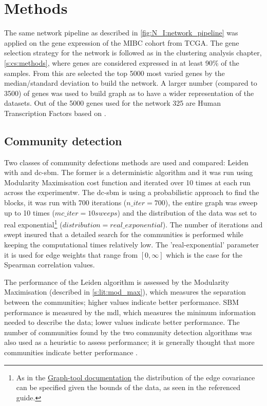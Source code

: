 \section{Methods}


The same network pipeline as described in \cref{fig:N_I:network_pipeline} was applied on the gene expression of the MIBC cohort from TCGA. The gene selection strategy for the network is followed as in the clustering analysis chapter, \cref{s:cs:methods}, where genes are considered expressed in at least 90\% of the samples. From this are selected the top 5000 most varied genes by the median/standard deviation to build the network. A larger number (compared to 3500) of genes was used to build graph as to have a wider representation of the datasets. Out of the 5000 genes used for the network 325 are Human Transcription Factors based on \citet{Lambert2018-el}.
 
\subsection*{Community detection} \label{s:N_I:sel_tfs_methods_comm_detection}

 Two classes of community defections methods are used and compared: Leiden with  and \acrfull{dc-sbm}. The former is a deterministic algorithm and it was run using Modularity Maximisation cost function and iterated over 10 times at each run across the experimentw. The \acrshort{dc-sbm} is using a probabilistic approach to find the blocks, it was run with 700 iterations ($n\_iter=700$), the entire graph was sweep up to 10 times ($mc\_iter = 10 sweeps$) and the distribution of the data was set to real exponential\footnote{As in the \href{https://graph-tool.skewed.de/static/doc/demos/inference/inference.html}{Graph-tool documentation} the distribution of the edge covariance can be specified given the bounds of the data, as seen in the referenced guide.} ($distribution = real\_exponential$). The number of iterations and swept insured that a detailed search for the communities is performed while keeping the computational times relatively low. The 'real-exponential' parameter it is used for edge weights that range from $[0, \infty]$ which is the case for the Spearman correlation values.


The performance of the Leiden algorithm is assessed by the Modularity Maximisation (described in \cref{s:lit:mod_max}), which measures the separation between the communities; higher values indicate better performance. SBM performance is measured by the \acrfull{mdl}, which measures the minimum information needed to describe the data; lower values indicate better performance. The number of communities found by the two community detection algorithms was also used as a heuristic to assess performance; it is generally thought that more communities indicate better performance \citep{Care2019-ij}. 


